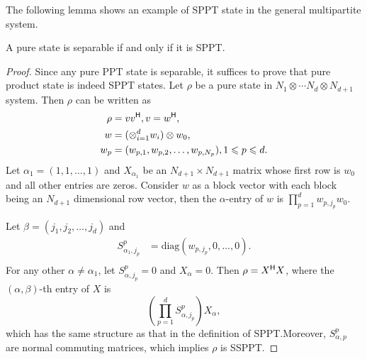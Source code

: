    The following lemma shows an example of SPPT state in the  general multipartite system.
   \begin{lem}
     A pure state is separable if and only if it is SPPT.\@
  \end{lem}
  \begin{proof}
    Since any pure PPT state is separable, it suffices to prove that pure product state is  indeed SPPT states.
    Let $\rho$ be a pure state in $N_1\otimes \cdots N_d\otimes N_{d+1}$ system. Then $\rho$ can be written as 
    \begin{equation}
      \label{eq:2}
      \begin{split}
        \rho &= v v^{\mathsf{H}},
      v = w^{\mathsf{H}}, \\
     w &=(\otimes_{i=1}^{d}w_i)\otimes w_0,\\
      w_p & = (w_{p,1},w_{p,2},\ldots,w_{p,N_p}),1\leqslant p\leqslant d.
      \end{split}
    \end{equation}
    Let $\alpha_1 = (1,1,\ldots,1) $ and $X_{\alpha_1}$ be an $N_{d+1}\times N_{d+1}$ matrix whose first row is
    $w_0$ and all other entries are zeros. Consider $w$ as a block vector with each block being an $N_{d+1}$ dimensional
    row vector, then the $\alpha$-entry of $w$ is $\prod_{p=1}^d w_{p,j_p} w_0$.

   Let $\beta  = (j_1,j_2,\ldots,j_d)$ and 
    \begin{equation}
      \label{eq:11}
      \begin{split}
        S_{\alpha_1,j_p}^p& =\mathrm{diag}( w_{p,j_p},0,\ldots,0).\\
      \end{split}
    \end{equation}
   For any other $\alpha\neq \alpha_1$, let $S_{\alpha,j_p}^p = 0$ and $X_{\alpha}=0$.  Then  $\rho = X^{\mathsf{H}} X$, where
    the  $(\alpha,\beta)$-th entry of $X$ is
    \begin{equation}
      \label{eq:47}
        \left(\prod_{p=1}^{d}S_{\alpha,j_p}^p\right) X_{\alpha},      
      \end{equation}
      which has the same structure as that in the definition of SPPT.\@ Moreover, $S_{\alpha,p}^p$  are normal commuting
      matrices, which implies $\rho$ is  SSPPT.\@
    \end{proof}

